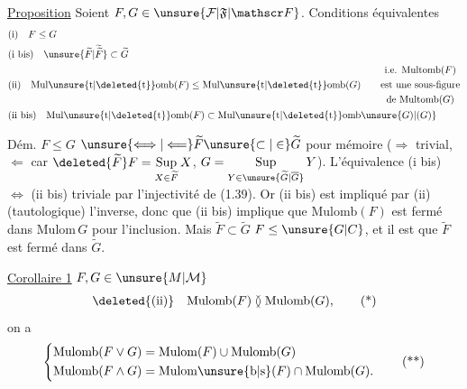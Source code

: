 
\uline{Proposition} Soient $F,G\in\unsure{\mathcal F|\mathfrak F|\mathscr F}$. Conditions équivalentes
\[
\begin{aligned}
&\text{(i)}\quad F\leq G\\
&\text{(i bis)}\quad \unsure{\widetilde F|\widetilde{\widetilde F}}\subset\widetilde G\\
&\text{(ii)}\quad \mathrm{Mul\unsure{t|\deleted{t}}omb}(F)\leq\mathrm{Mul\unsure{t|\deleted{t}}omb}(G)
 \qquad\begin{gathered}\text{i.e. }\mathrm{Multomb}(F)\\\text{est une sous-figure}\\\text{de }\mathrm{Multomb}(G)\end{gathered}\\
&\text{(ii bis)}\quad \mathrm{Mul\unsure{t|\deleted{t}}omb}(F)\subset\mathrm{Mul\unsure{t|\deleted{t}}omb}\unsure{G)|(G)}
\end{aligned}
\]

Dém. $F\leq G$  $\unsure{\Longleftrightarrow|\Longleftarrow}\widetilde F\unsure{\subset|\in}\widetilde G$   pour mémoire ($\Longrightarrow$ trivial, $\Longleftarrow$ car $\deleted{\widetilde F}F=\mathop{\mathrm{Sup}}\limits_{X\in\widetilde F}X$, $G=\mathop{\mathrm{Sup}}\limits_{Y\in\unsure{\widetilde G|\overline G}}Y$). L'équivalence (i bis) $\Longleftrightarrow$ (ii bis) triviale par l'injectivité de (1.39). Or (ii bis) est impliqué par (ii) (tautologique)  l'inverse, donc que (ii bis) implique que $\mathrm{Mulomb}(F)$ est fermé dans $\mathrm{Mulom}\,G$ pour l'inclusion. Mais  $\widetilde F\subset\widetilde G$   $F\leq\unsure{G|C}$, et il est  que $\widetilde F$ est  fermé dans $\widetilde G$.

\uline{Corollaire 1}  $F,G\in\unsure{M|\mathcal M}$  
\[
 \deleted{\text{(ii)}}\quad \mathrm{Mulomb}(F)\between\mathrm{Mulomb}(G),
 \tag*{(*)}
\]
 on a
\[
 \left\{\begin{aligned}
  \mathrm{Mulomb}(F\vee G)&=\mathrm{Mulom}(F)\cup\mathrm{Mulomb}(G)\\
  \mathrm{Mulomb}(F\wedge G)&=\mathrm{Mulom\unsure{b|s}}(F)\cap\mathrm{Mulomb}(G).
 \end{aligned}\right.
 \tag*{(**)}
\]

